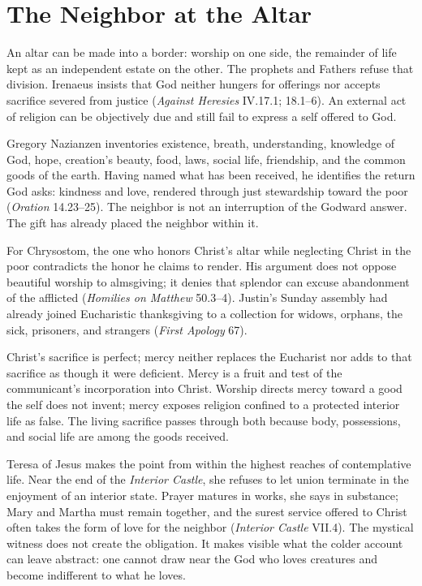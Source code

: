 \section{The Neighbor at the Altar}

An altar can be made into a border: worship on one side, the remainder of life kept as an independent estate on the other. The prophets and Fathers refuse that division. Irenaeus insists that God neither hungers for offerings nor accepts sacrifice severed from justice (\emph{Against Heresies} IV.17.1; 18.1--6). An external act of religion can be objectively due and still fail to express a self offered to God.

Gregory Nazianzen inventories existence, breath, understanding, knowledge of God, hope, creation's beauty, food, laws, social life, friendship, and the common goods of the earth. Having named what has been received, he identifies the return God asks: kindness and love, rendered through just stewardship toward the poor (\emph{Oration} 14.23--25). The neighbor is not an interruption of the Godward answer. The gift has already placed the neighbor within it.

For Chrysostom, the one who honors Christ's altar while neglecting Christ in the poor contradicts the honor he claims to render. His argument does not oppose beautiful worship to almsgiving; it denies that splendor can excuse abandonment of the afflicted (\emph{Homilies on Matthew} 50.3--4). Justin's Sunday assembly had already joined Eucharistic thanksgiving to a collection for widows, orphans, the sick, prisoners, and strangers (\emph{First Apology} 67).

Christ's sacrifice is perfect; mercy neither replaces the Eucharist nor adds to that sacrifice as though it were deficient. Mercy is a fruit and test of the communicant's incorporation into Christ. Worship directs mercy toward a good the self does not invent; mercy exposes religion confined to a protected interior life as false. The living sacrifice passes through both because body, possessions, and social life are among the goods received.

Teresa of Jesus makes the point from within the highest reaches of contemplative life. Near the end of the \emph{Interior Castle}, she refuses to let union terminate in the enjoyment of an interior state. Prayer matures in works, she says in substance; Mary and Martha must remain together, and the surest service offered to Christ often takes the form of love for the neighbor (\emph{Interior Castle} VII.4). The mystical witness does not create the obligation. It makes visible what the colder account can leave abstract: one cannot draw near the God who loves creatures and become indifferent to what he loves.

